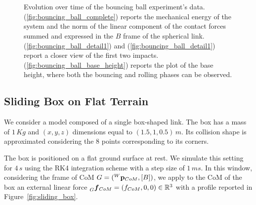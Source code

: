 \begin{figure}
    \centering
    \\
    \\
    \caption{Evolution over time of the bouncing ball experiment's data. (\ref{fig:bouncing_ball_complete}) reports the mechanical energy of the system and the norm of the linear component of the contact forces summed and expressed in the $B$ frame of the spherical link. (\ref{fig:bouncing_ball_detail1}) and (\ref{fig:bouncing_ball_detail1}) report a closer view of the first two impacts. (\ref{fig:bouncing_ball_base_height}) reports the plot of the base height, where both the bouncing and rolling phases can be observed.}
    \label{fig:bouncing_ball}
\end{figure}

\subsection{Sliding Box on Flat Terrain}

We consider a model composed of a single box-shaped link.
The box has a mass of $1 \, Kg$ and $(x, y, z)$ dimensions equal to $(1.5, 1, 0.5) \, m$.
Its collision shape is approximated considering the 8 points corresponding to its corners.

The box is positioned on a flat ground surface at rest.
We simulate this setting for $4 \, s$ using the \ac{RK4} integration scheme with a step size of $1 \, ms$.
In this window, considering the frame of \ac{CoM} $G = (\pos[W]_{CoM}, [B])$, we apply to the \ac{CoM} of the box an external linear force $\forcelin[G]_{CoM} = (f_{CoM}, 0, 0) \in \realn^3$ with a profile reported in Figure~\ref{fig:sliding_box}.

